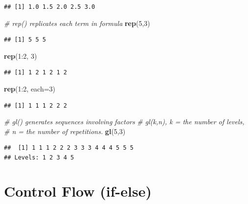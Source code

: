 \documentclass[]{book}
\newenvironment{Shaded}{\begin{snugshade}}{\end{snugshade}}
\newcommand{\KeywordTok}[1]{\textcolor[rgb]{0.13,0.29,0.53}{\textbf{{#1}}}}
\newcommand{\DataTypeTok}[1]{\textcolor[rgb]{0.13,0.29,0.53}{{#1}}}
\newcommand{\DecValTok}[1]{\textcolor[rgb]{0.00,0.00,0.81}{{#1}}}
\newcommand{\CommentTok}[1]{\textcolor[rgb]{0.56,0.35,0.01}{\textit{{#1}}}}
\newcommand{\NormalTok}[1]{{#1}}
\begin{document}
\begin{verbatim}
## [1] 1.0 1.5 2.0 2.5 3.0
\end{verbatim}

\begin{Shaded}
\begin{Highlighting}[]
\CommentTok{# rep() replicates each term in formula}
\KeywordTok{rep}\NormalTok{(}\DecValTok{5}\NormalTok{,}\DecValTok{3}\NormalTok{)}
\end{Highlighting}
\end{Shaded}

\begin{verbatim}
## [1] 5 5 5
\end{verbatim}

\begin{Shaded}
\begin{Highlighting}[]
\KeywordTok{rep}\NormalTok{(}\DecValTok{1}\NormalTok{:}\DecValTok{2}\NormalTok{, }\DecValTok{3}\NormalTok{)}
\end{Highlighting}
\end{Shaded}

\begin{verbatim}
## [1] 1 2 1 2 1 2
\end{verbatim}

\begin{Shaded}
\begin{Highlighting}[]
\KeywordTok{rep}\NormalTok{(}\DecValTok{1}\NormalTok{:}\DecValTok{2}\NormalTok{, }\DataTypeTok{each=}\DecValTok{3}\NormalTok{)}
\end{Highlighting}
\end{Shaded}

\begin{verbatim}
## [1] 1 1 1 2 2 2
\end{verbatim}

\begin{Shaded}
\begin{Highlighting}[]
\CommentTok{# gl() generates sequences involving factors}
\CommentTok{# gl(k,n), k = the number of levels, }
\CommentTok{# n = the number of repetitions.}
\KeywordTok{gl}\NormalTok{(}\DecValTok{5}\NormalTok{,}\DecValTok{3}\NormalTok{)}
\end{Highlighting}
\end{Shaded}

\begin{verbatim}
##  [1] 1 1 1 2 2 2 3 3 3 4 4 4 5 5 5
## Levels: 1 2 3 4 5
\end{verbatim}

\section{Control Flow (if-else)}\label{control-flow-if-else}
\end{document}
